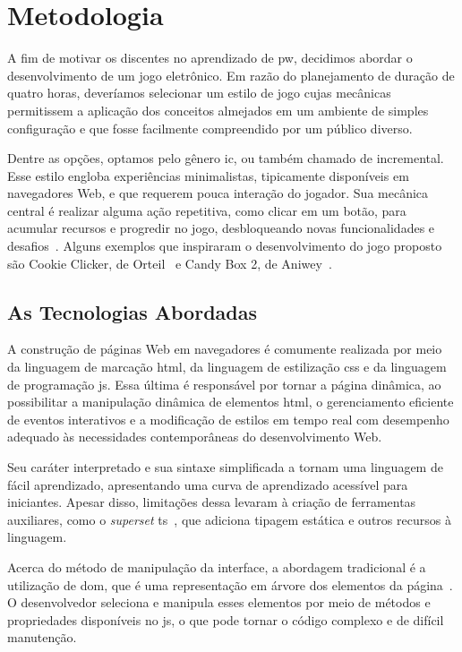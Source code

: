 \section{Metodologia}%
\label{sec:metodologia}

A fim de motivar os discentes no aprendizado de \gls{pw}, decidimos abordar o desenvolvimento de um jogo eletrônico.
Em razão do planejamento de duração de quatro horas, deveríamos selecionar um estilo de jogo cujas mecânicas permitissem a aplicação dos conceitos almejados em um ambiente de simples configuração e que fosse facilmente compreendido por um público diverso.

Dentre as opções, optamos pelo gênero \gls{ic}, ou também chamado de incremental.
Esse estilo engloba experiências minimalistas, tipicamente disponíveis em navegadores Web, e que requerem pouca interação do jogador.
Sua mecânica central é realizar alguma ação repetitiva, como clicar em um botão, para acumular recursos e progredir no jogo, desbloqueando novas funcionalidades e desafios~\cite{alharthi:2018:playing_to_wait}.
Alguns exemplos que inspiraram o desenvolvimento do jogo proposto são Cookie Clicker, de Orteil~\cite{orteil:2013:cookie_clicker} e Candy Box 2, de Aniwey~\cite{aniwey:2013:candy_box_2}.

\subsection{As Tecnologias Abordadas}

A construção de páginas Web em navegadores é comumente realizada por meio da linguagem de marcação \gls{html}, da linguagem de estilização \gls{css} e da linguagem de programação \gls{js}.
Essa última é responsável por tornar a página dinâmica, ao possibilitar a manipulação dinâmica de elementos \gls{html}, o gerenciamento eficiente de eventos interativos e a modificação de estilos em tempo real com desempenho adequado às necessidades contemporâneas do desenvolvimento Web.

Seu caráter interpretado e sua sintaxe simplificada a tornam uma linguagem de fácil aprendizado, apresentando uma curva de aprendizado acessível para iniciantes.
Apesar disso, limitações dessa levaram à criação de ferramentas auxiliares, como o \textit{superset} \gls{ts}~\cite{microsoft:2012:typescript}, que adiciona tipagem estática e outros recursos à linguagem.

Acerca do método de manipulação da interface, a abordagem tradicional é a utilização de \gls{dom}, que é uma representação em árvore dos elementos da página~\cite{whatwg:2025:dom_standard}.
O desenvolvedor seleciona e manipula esses elementos por meio de métodos e propriedades disponíveis no \gls{js}, o que pode tornar o código complexo e de difícil manutenção.

